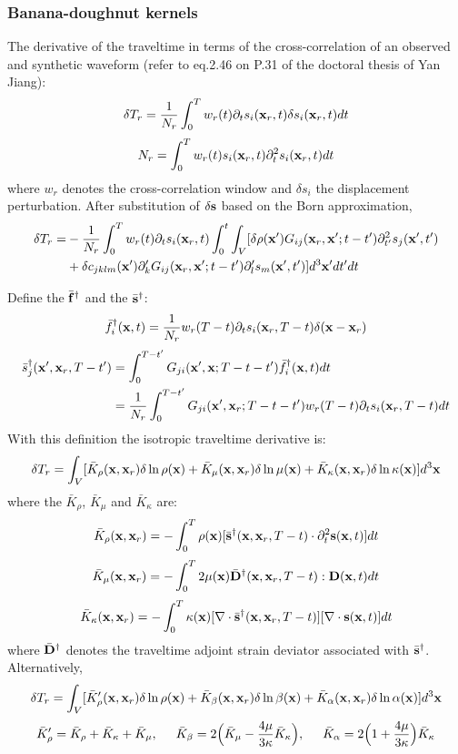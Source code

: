 \subsubsection{Banana-doughnut kernels}
The \Frechet derivative of the traveltime in terms of the cross-correlation of an observed and synthetic waveform (refer to eq.2.46 on P.31 of the doctoral thesis of Yan Jiang):
\[ \delta T_r=\frac{1}{N_r}\int_0^Tw_r(t)\partial_ts_i(\mathbf{x}_r,t)\delta s_i(\mathbf{x}_r,t)dt \]
\[ N_r=\int_0^Tw_r(t)s_i(\mathbf{x}_r,t)\partial_t^2s_i(\mathbf{x}_r,t)dt \]
where $w_r$ denotes the cross-correlation window and $\delta s_i$ the displacement perturbation. After substitution of $\delta\mathbf{s}$ based on the Born approximation,
\begin{align*}
  \delta T_r= & -\frac{1}{N_r}\int_0^Tw_r(t)\partial_ts_i(\mathbf{x}_r,t)\int_0^t\int_V[\delta\rho(\mathbf{x}')G_{ij}(\mathbf{x}_r,\mathbf{x}';t-t')\partial_{t'}^2s_j(\mathbf{x}',t') \\
    & +\delta c_{jklm}(\mathbf{x}')\partial_k^\prime G_{ij}(\mathbf{x}_r,\mathbf{x}';t-t')\partial_l^\prime s_m(\mathbf{x}',t')]d^3\mathbf{x}'dt'dt
\end{align*}\par
Define the  $\bar{\mathbf{f}}^\dagger$ and the  $\bar{\mathbf{s}}^\dagger$:
\[ \bar f_i^\dagger(\mathbf{x},t)=\frac{1}{N_r}w_r(T-t)\partial_ts_i(\mathbf{x}_r,T-t)\delta(\mathbf{x}-\mathbf{x}_r) \]
\begin{align*}
  \bar s_j^\dagger(\mathbf{x}',\mathbf{x}_r,T-t') & =\int_0^{T-t'}G_{ji}(\mathbf{x}',\mathbf{x};T-t-t')\bar f_i^\dagger(\mathbf{x},t)dt \\
    & =\frac{1}{N_r}\int_0^{T-t'}G_{ji}(\mathbf{x}',\mathbf{x}_r;T-t-t')w_r(T-t)\partial_ts_i(\mathbf{x}_r,T-t)dt
\end{align*}
With this definition the isotropic traveltime \Frechet derivative is:
\[ \delta T_r=\int_V[\bar K_\rho(\mathbf{x},\mathbf{x}_r)\delta\ln\rho(\mathbf{x})+\bar K_\mu(\mathbf{x},\mathbf{x}_r)\delta\ln\mu(\mathbf{x})+\bar K_\kappa(\mathbf{x},\mathbf{x}_r)\delta\ln\kappa(\mathbf{x})]d^3\mathbf{x} \]
where the  $\bar K_\rho$, $\bar K_\mu$ and $\bar K_\kappa$ are:
\[ \bar K_\rho(\mathbf{x},\mathbf{x}_r)=-\int_0^T\rho(\mathbf{x})[\bar{\mathbf{s}}^\dagger(\mathbf{x},\mathbf{x}_r,T-t)\cdot\partial_t^2\mathbf{s}(\mathbf{x},t)]dt \]
\[ \bar K_\mu(\mathbf{x},\mathbf{x}_r)=-\int_0^T2\mu(\mathbf{x})\bar{\mathbf{D}}^\dagger(\mathbf{x},\mathbf{x}_r,T-t):\mathbf{D}(\mathbf{x},t)dt \]
\[ \bar K_\kappa(\mathbf{x},\mathbf{x}_r)=-\int_0^T\kappa(\mathbf{x})[\nabla\cdot\bar{\mathbf{s}}^\dagger(\mathbf{x},\mathbf{x}_r,T-t)][\nabla\cdot\mathbf{s}(\mathbf{x},t)]dt \]
where $\bar{\mathbf{D}}^\dagger$ denotes the traveltime adjoint strain deviator associated with $\bar{\mathbf{s}}^\dagger$. Alternatively,
\[ \delta T_r=\int_V[\bar K_\rho^\prime(\mathbf{x},\mathbf{x}_r)\delta\ln\rho(\mathbf{x})+\bar K_\beta(\mathbf{x},\mathbf{x}_r)\delta\ln\beta(\mathbf{x})+\bar K_\alpha(\mathbf{x},\mathbf{x}_r)\delta\ln\alpha(\mathbf{x})]d^3\mathbf{x} \]
\[ \bar K_\rho^\prime=\bar K_\rho+\bar K_\kappa+\bar K_\mu, \hspace{5mm} \bar K_\beta=2\Big(\bar K_\mu-\frac{4\mu}{3\kappa}\bar K_\kappa\Big), \hspace{5mm} \bar K_\alpha=2\Big(1+\frac{4\mu}{3\kappa}\Big)\bar K_\kappa \]\par
